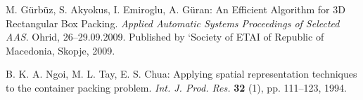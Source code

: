 \documentclass[12pt]{article}
\begin{document}
\begin{thebibliography}{99}

	 M. G\"{u}rb\"{u}z, S. Akyokus, I. Emiroglu, A. G\"{u}ran: An Efficient Algorithm for 3D Rectangular Box Packing. \emph{Applied Automatic Systems Proceedings of Selected AAS}. Ohrid, 26--29.09.2009. Published by `Society of ETAI of Republic of Macedonia, Skopje, 2009.

	 B. K. A. Ngoi, M. L. Tay, E. S. Chua: Applying spatial representation techniques to the container packing problem. \emph{Int. J. Prod. Res.} \textbf{32} (1), pp. 111--123, 1994.

\end{thebibliography}
\end{document}
